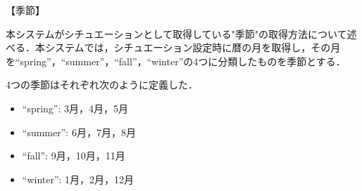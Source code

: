 【季節】
\par 本システムがシチュエーションとして取得している"季節"の取得方法について述べる．本システムでは，シチュエーション設定時に暦の月を取得し，その月を“spring”，“summer”，“fall”，“winter”の4つに分類したものを季節とする．
\par 4つの季節はそれぞれ次のように定義した．
\begin{itemize}
 \item “spring”: 3月，4月，5月
 \item “summer”: 6月，7月，8月
 \item “fall”: 9月，10月，11月
 \item “winter”: 1月，2月，12月
\end{itemize}
